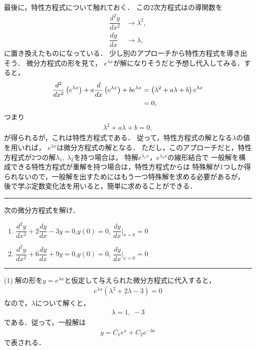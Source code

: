 最後に，特性方程式について触れておく．
この2次方程式はの導関数を
\begin{align}
 \dfrac{d^{2}y}{dx^{2}} & \to \lambda^{2}, \\
 \dfrac{dy}{dx}         & \to \lambda, 
\end{align}
に置き換えたものになっている．
少し別のアプローチから特性方程式を導き出そう．
微分方程式の形を見て，
$e^{\lambda x}$が解になりそうだと予想し代入してみる．すると，
\begin{align}
  \dfrac{d^{2}}{dx^{2}}\left(e^{\lambda x}\right)+a\dfrac{d}{dx}\left(e^{\lambda x}\right)+be^{\lambda x} & =\left(\lambda^{2}+a\lambda+b\right)e^{\lambda x}\notag \\
 & =0,
\end{align}
つまり
\begin{align}
  \lambda^2 + a \lambda + b = 0, 
\end{align}
が得られるが，これは特性方程式である．
従って，特性方程式の解となる$\lambda$の値を用いれば，
$e^{\lambda x}$は微分方程式の解となる．
ただし，このアプローチだと，特性方程式が2つの解$\lambda_1,~\lambda_2$を持つ場合は，
特解$e^{\lambda_1 x}$，$e^{\lambda_2 x}$の線形結合で
一般解を構成できる特性方程式が重解を持つ場合は，特性方程式からは
特殊解が1つしか得られないので，一般解を出すためにはもう一つ特殊解を求める必要があるが，
後で学ぶ定数変化法を用いると，簡単に求めることができる．
%
\newpage
\hrule
\reidai
次の微分方程式を解け．
\begin{enumerate}[(1)]
  \item $\dfrac{d^2y}{dx^2} + 2 \dfrac{dy}{dx} - 3y = 0$,\quad $y(0)=0$, \quad $\dfrac{dy}{dx}\biggr|_{x=0} = 0$
  \item $\dfrac{d^2y}{dx^2} + 6 \dfrac{dy}{dx} + 9y = 0$,\quad $y(0)=0$, \quad $\dfrac{dy}{dx}\biggr|_{x=0} = 0$ 
\end{enumerate}
\vspace*{.2cm}
\hrule
\vspace*{.2cm}
%
(1) 解の形を$y=e^{\lambda x}$と仮定して与えられた微分方程式に代入すると，
\begin{align}
  e^{\lambda x}\left(\lambda^2 + 2\lambda - 3\right) = 0 
\end{align}
なので，$\lambda$について解くと，
\begin{align}
 \lambda = 1,~ -3 
\end{align}
である．従って，一般解は
\begin{align}
 y = C_{1}e^{x} + C_{2}e^{-3x} 
\end{align}
で表される．

